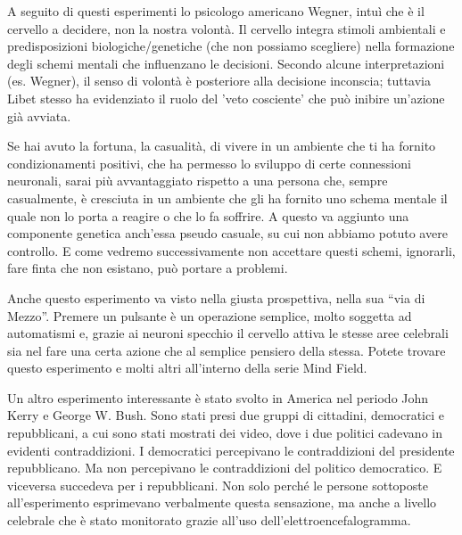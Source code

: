 \documentclass[12pt]{book} %
\begin{document}
A seguito di questi esperimenti lo psicologo americano Wegner, intuì che è il cervello a decidere, non la nostra
volontà. Il cervello integra stimoli ambientali e predisposizioni biologiche/genetiche (che non possiamo scegliere) nella formazione degli schemi mentali che influenzano le decisioni. Secondo alcune interpretazioni (es. Wegner), il senso di volontà è posteriore alla decisione inconscia; tuttavia Libet stesso ha evidenziato il ruolo del 'veto cosciente' che può inibire un'azione già avviata.

Se hai avuto la fortuna, la casualità, di vivere in un ambiente che ti ha fornito condizionamenti positivi, che ha
permesso lo sviluppo di certe connessioni neuronali, sarai più avvantaggiato rispetto a una persona che, sempre
casualmente, è cresciuta in un ambiente che gli ha fornito uno schema mentale il quale non lo porta a reagire o che lo
fa soffrire. A questo va aggiunto una componente genetica anch'essa pseudo casuale, su cui non
abbiamo potuto avere controllo. E come vedremo successivamente non accettare questi schemi, ignorarli, fare finta che
non esistano, può portare a problemi.

Anche questo esperimento va visto nella giusta prospettiva, nella sua “via di Mezzo”. Premere un pulsante è un
operazione semplice, molto soggetta ad automatismi e, grazie ai neuroni specchio il cervello attiva le stesse aree
celebrali sia nel fare una certa azione che al semplice pensiero della stessa. Potete trovare questo esperimento e
molti altri all'interno della serie Mind
Field.

Un altro esperimento interessante è stato svolto in America nel periodo John Kerry e George W. Bush. Sono stati presi
due gruppi di cittadini, democratici e repubblicani, a cui sono stati mostrati dei video, dove i due politici cadevano
in evidenti contraddizioni. I democratici percepivano le contraddizioni del presidente repubblicano. Ma non percepivano
le contraddizioni del politico democratico. E viceversa succedeva per i repubblicani. Non solo perché le persone
sottoposte all'esperimento esprimevano verbalmente questa sensazione, ma anche a livello celebrale
che è stato monitorato grazie all'uso dell'elettroencefalogramma.
\end{document}
